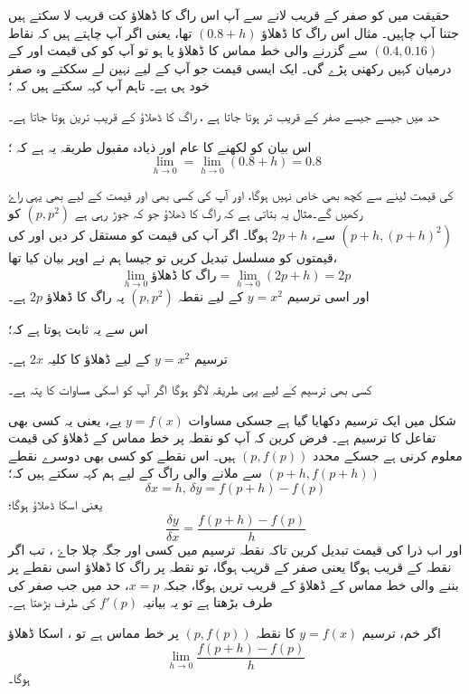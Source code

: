 حقیقت میں  کو صفر کے قریب لانے سے آپ اس راگ کا ڈھلاؤ  کت قریب لا سکتے ہیں جتنا آپ چاہیں۔ مثال  اس راگ کا ڈھلاؤ \( (0.8+h) \) تھا، یعنی اگر آپ چاہتے ہیں کہ نقاط \( (0.4 , 0.16) \) سے گزرنے والی خط مماس کا ڈھلاؤ  یا  ہو تو آپ کو  کی قیمت  اور  کے درمیان کہیں رکھنی پڑے گی۔
ایک ایسی قیمت جو آپ  کے لیے نہین لے سککتے وہ صفر خود ہی ہے۔ تاہم آپ کہہ سکتے ہیں کہ ؛

حد میں جیسے جیسے  صفر کے قریب تر ہوتا جاتا ہے ، راگ کا ڈھلاؤ  کے قریب ترین ہوتا جاتا ہے۔

اس بیان کو لکھنے کا عام اور ذیادہ مقبول طریقہ یہ ہے کہ ؛
\[\lim_{h \to 0} \texttt{}=\lim_{h \to 0}(0.8+h)=0.8 \]

 کی قیمت  لینے سے کچھ بھی خاص نہیں ہوگا، اور آپ  کی کسی بھی اور قیمت کے لیے بھی یہی راۓ رکھیں گے۔مثال  یہ بتاتی ہے کہ راگ کا ڈھلاؤ جو کہ جوڑ رہی ہے \((p,p^2)\) کو \((p+h,(p+h)^2)\) سے، \(2p+h\) ہوگا۔ اگر آپ  کی قیمت کو مستقل کر دیں اور  کی قیمتوں کو مسلسل تبدیل کریں تو جیسا ہم نے اوپر بیان کیا تھا، 
\[\lim_{h \to 0} \texttt{راگ کا ڈھلاؤ}=\lim_{h \to 0}(2p+h)=2p \]
اور اسی ترسیم \(y=x^2\) کے  لیے نقطہ \((p,p^2)\) پہ راگ کا ڈھلاؤ \(2p\) ہے۔

اس سے یہ ثابت ہوتا ہے کہ؛

ترسیم  \(y=x^2\) کے لیے ڈھلاؤ کا کلیہ \(2x\) ہے۔

کسی بھی ترسیم کے لیے یہی طریقہ لاگو ہوگا اگر آپ کو اسکی مساوات کا پتہ ہے۔

شکل  میں ایک ترسیم دکھایا گیا ہے جسکی مساوات \(y=f(x)\) یے، یعنی یہ کسی بھی تفاعل کا ترسیم ہے۔ فرض کرین کہ آپ کو نقطہ               پر خط مماس کے ڈھلاؤ کی قیمت معلوم کرنی ہے جسکے محدد \((p,f(p))\) ہیں۔ اس نقطے کو کسی بھی دوسرے نقطے \((p+h,f(p+h))\) سے ملانے والی راگ کے لیے ہم کہہ سکتے ہیں کہ؛ \[\delta x=h, \, \delta y=f(p+h)-f(p)\]
یعنی اسکا ڈھلاؤ ہوگا؛
\[\frac{\delta y}{\delta x}=\frac{f(p+h)-f(p)}{h}\]
 اور اب ذرا  کی قیمت تبدیل کرین تاکہ نقطہ  ترسیم میں کسی اور جگہ چلا جاۓ ، تب اگر نقطہ  کے قریب ہوگا یعنی  صفر کے قریب ہوگا، تو نقطہ  پر راگ کا ڈھلاؤ اسی نقطے پر بننے والی خط مماس کے ڈھلاؤ کے قریب ترین ہوگا، جبکہ \(x=p\)، حد میں جب  صفر کی طرف بڑھتا ہے تو یہ بیانیہ \(f'(p)\) کی طرف بڑھتا ہے۔

اگر خم، ترسیم \(y=f(x)\) کا نقطہ \((p,f(p))\) پر خط مماس ہے تو ، اسکا ڈھلاؤ \[\lim_{h \to 0} \frac{f(p+h)-f(p)}{h}\] ہوگا۔

